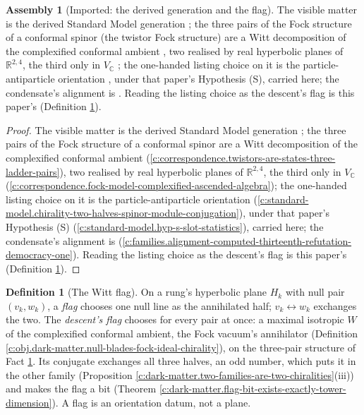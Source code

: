 \documentclass[11pt]{article}
\theoremstyle{definition}
\newtheorem{definition}[theorem]{Definition}
\newtheorem{assembled}[theorem]{Assembly}
\theoremstyle{plain}
\newcommand{\changedmark}[2]{\marginpar{\raggedright\scriptsize\color{#1}#2}}
\providecommand{\C}{}\renewcommand{\C}{\mathbb{C}}
\providecommand{\R}{}\renewcommand{\R}{\mathbb{R}}
\begin{document}
\begin{assembled}[Imported: the derived generation and the flag]\label{c:dark-matter.imported-derived-generation-flag}
\changedmark{gray}{reworded}
The visible matter is the derived Standard Model generation \cite{ButlerT12}; the three pairs of the Fock structure of a conformal spinor (the twistor Fock structure) are a Witt decomposition of the complexified conformal ambient \cite[Thm.~5.3]{ButlerT9}, two realised by real hyperbolic planes of $\R^{2,4}$, the third only in $V_{\C}$ \cite[proof of Thm.~3.1]{ButlerT9}; the one-handed listing choice on it is the particle-antiparticle orientation \cite[Prop.~5.6]{ButlerT12}, under that paper's Hypothesis (S), carried here; the condensate's alignment is \cite[Prop.~4.3]{ButlerT13}. Reading the listing choice as the descent's flag is this paper's (Definition \ref{c:obj.dark-matter.witt-flag}).
\end{assembled}
\begin{proof}
The visible matter is the derived Standard Model generation \cite{ButlerT12}; the three pairs of the Fock structure of a conformal spinor are a Witt decomposition of the complexified conformal ambient \cite[Thm.~5.3]{ButlerT9} (\ref{c:correspondence.twistors-are-states-three-ladder-pairs}), two realised by real hyperbolic planes of $\R^{2,4}$, the third only in $V_{\C}$ \cite[proof of Thm.~3.1]{ButlerT9} (\ref{c:correspondence.fock-model-complexified-ascended-algebra}); the one-handed listing choice on it is the particle-antiparticle orientation \cite[Prop.~5.6]{ButlerT12} (\ref{c:standard-model.chirality-two-halves-spinor-module-conjugation}), under that paper's Hypothesis (S) (\ref{c:standard-model.hyp-s-slot-statistics}), carried here; the condensate's alignment is \cite[Prop.~4.3]{ButlerT13} (\ref{c:families.alignment-computed-thirteenth-refutation-democracy-one}). Reading the listing choice as the descent's flag is this paper's (Definition \ref{c:obj.dark-matter.witt-flag}).

\end{proof}

\begin{definition}[The Witt flag]\label{c:obj.dark-matter.witt-flag}
On a rung's hyperbolic plane $H_k$ with null pair $(v_k, w_k)$, a \emph{flag} chooses one null line as the annihilated half; $v_k \leftrightarrow w_k$ exchanges the two. The \emph{descent's flag} chooses for every pair at once: a maximal isotropic $W$ of the complexified conformal ambient, the Fock vacuum's annihilator (Definition \ref{c:obj.dark-matter.null-blades-fock-ideal-chirality}), on the three-pair structure of Fact \ref{c:dark-matter.imported-derived-generation-flag}. Its conjugate exchanges all three halves, an odd number, which puts it in the other family (Proposition \ref{c:dark-matter.two-families-are-two-chiralities}(iii)) and makes the flag a bit (Theorem \ref{c:dark-matter.flag-bit-exists-exactly-tower-dimension}). A flag is an orientation datum, not a plane.
\end{definition}
\end{document}
